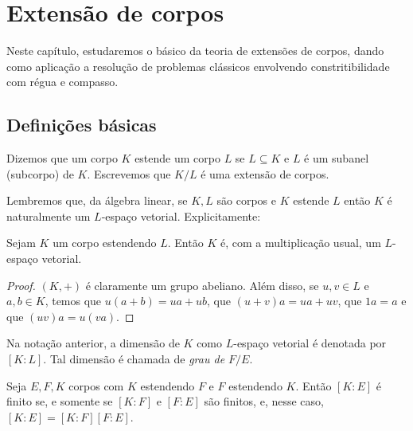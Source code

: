 \chapter{Extensão de corpos}
Neste capítulo, estudaremos o básico da teoria de extensões de corpos, dando como aplicação a resolução de problemas clássicos envolvendo constritibilidade com régua e compasso.
\section{Definições básicas}
\begin{definition}
Dizemos que um corpo $K$ estende um corpo $L$ se $L\subseteq K$ e $L$ é um subanel (subcorpo) de $K$. Escrevemos que $K/L$ é uma extensão de corpos.
\end{definition}

Lembremos que, da álgebra linear, se $K, L$ são corpos e $K$ estende $L$ então $K$ é naturalmente um $L$-espaço vetorial. Explicitamente:

\begin{prop}
    Sejam $K$ um corpo estendendo $L$. Então $K$ é, com a multiplicação usual, um $L$-espaço vetorial.
\end{prop}

\begin{proof}
    $(K, +)$ é claramente um grupo abeliano. Além disso, se $u, v \in L$ e $a, b \in K$, temos que $u(a+b)=ua+ub$, que $(u+v)a=ua+uv$, que $1a=a$ e que $(uv)a=u(va)$.
\end{proof}

\begin{definition}
Na notação anterior, a dimensão de $K$ como $L$-espaço vetorial é denotada por $[K:L]$. Tal dimensão é chamada de \emph{grau de $F/E$}.
\end{definition}

\begin{lemma}
Seja $E, F, K$ corpos com $K$ estendendo $F$ e $F$ estendendo $K$. Então $[K:E]$ é finito se, e somente se $[K:F]$ e $[F:E]$ são finitos, e, nesse caso, $[K:E]=[K:F][F:E]$.
\end{lemma}

